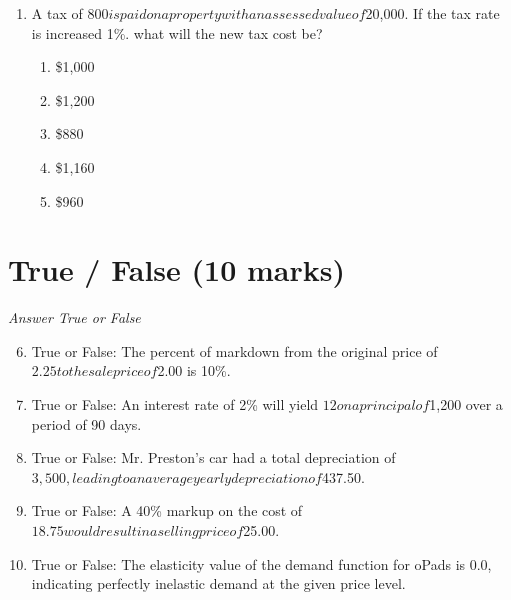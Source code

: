 \documentclass[12pt]{article}
\begin{document}
\begin{enumerate}[label=\arabic*.]
\begin{enumerate}[label=(\alph*)]
    \item Globalisation, Technological, Financial, Accountability
    \item Globalisation, Economic, Legal, Accountability
    \item Privatisation, Technological, Financial, Accountability
    \item Privatisation, Cultural, Legal, Accountability
    \item Nationalisation, Cultural, Environmental, Accountability
\end{enumerate}
\item A tax of $800 is paid on a property with an assessed value of $20,000. If the tax rate is increased 1\%. what will the new tax cost be?
\begin{enumerate}[label=(\alph*)]
    \item \$1,000
    \item \$1,200
    \item \$880
    \item \$1,160
    \item \$960
\end{enumerate}
\end{enumerate}

\section*{True / False (10 marks)}
\textit{Answer True or False}
\begin{enumerate}[label=\arabic*.]
\setcounter{enumi}{5}
\item True or False: The percent of markdown from the original price of $2.25 to the sale price of $2.00 is 10\%.
\item True or False: An interest rate of 2\% will yield $12 on a principal of $1,200 over a period of 90 days.
\item True or False: Mr. Preston's car had a total depreciation of $3,500, leading to an average yearly depreciation of $437.50.
\item True or False: A 40\% markup on the cost of $18.75 would result in a selling price of $25.00.
\item True or False: The elasticity value of the demand function for oPads is 0.0, indicating perfectly inelastic demand at the given price level.
\end{enumerate}
\end{document}
